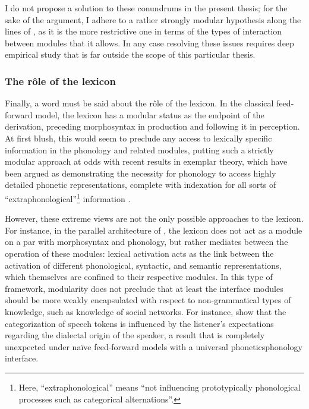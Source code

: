 I do not propose a solution to these conundrums in the present thesis; for the sake of the argument, I adhere to a rather strongly modular hypothesis along the lines of \citet{bermudez-oterong}, as it is the more restrictive one in terms of the types of interaction between modules that it allows. In any case resolving these issues requires deep empirical study that is far outside the scope of this particular thesis.

\subsubsection{The rôle of the lexicon}
\label{sec:role-lexicon}

Finally, a word must be said about the rôle of the lexicon. In the classical feed\hyp forward model, the lexicon has a modular status as the endpoint of the derivation, preceding morphosyntax in production and following it in perception. At first blush, this would seem to preclude any access to lexically specific information in the phonology and related modules, putting such a strictly modular approach at odds with recent results in exemplar theory, which have been argued as demonstrating the necessity for phonology to access highly detailed phonetic representations, complete with indexation for all sorts of \enquote{extraphonological}\footnote{Here, \enquote{extraphonological} means \enquote{not influencing prototypically phonological processes such as categorical alternations}.} information \citep{pierrehumbert01:_exemp,pierrehumbert02:_word,scobbie07:_inter}.

However, these extreme views are not the only possible approaches to the lexicon. For instance, in the parallel architecture of \citet{jackendoff97,jackendoff07:_found}, the lexicon does not act as a module on a par with morphosyntax and phonology, but rather mediates between the operation of these modules: lexical activation acts as the link between the activation of different phonological, syntactic, and semantic representations, which themselves are confined to their respective modules. In this type of framework, modularity does not preclude that at least the interface modules should be more weakly encapsulated with respect to non\hyp grammatical types of knowledge, such as knowledge of social networks. For instance, \citet{niedzielski99,hay06:_from,hay10:_stuff} show that the categorization of speech tokens is influenced by the listener's expectations regarding the dialectal origin of the speaker, a result that is completely unexpected under naïve feed\hyp forward models with a universal phonetics\endash phonology interface.

